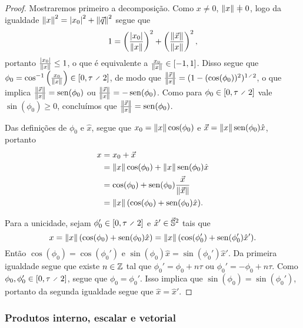 \begin{proof}
Mostraremos primeiro a decomposição. Como $x \neq 0$, $\nor{x} \neq 0$, logo da igualdade $\nor{x}^2 = \abs{\esc{x}}^2 + \nor{\vec{q}}^2$ segue que
	\begin{equation*}
	1 = \left( \frac{\abs{\esc{x}}}{\nor{x}} \right)^2 + \left( \frac{\nor{\vec{x}}}{\nor{x}} \right)^2,
	\end{equation*}
portanto $\frac{\abs{\esc{x}}}{\nor{x}} \leq 1$, o que é equivalente a $\frac{\esc{x}}{\nor{x}} \in \intff{-1}{1}$. Disso segue que $\phi_0 = \cos\inv\left( \frac{\esc{x}}{\nor{x}} \right) \in \intff{0}{\tau \div 2}$, de modo que $\frac{\nor{\vec{x}}}{\nor{x}} = (1-(\cos(\phi_0))^2)^{1 \div 2}$, o que implica $\frac{\nor{\vec{x}}}{\nor{x}}=\sin(\phi_0)$ ou $\frac{\nor{\vec{x}}}{\nor{x}}=-\sin(\phi_0)$. Como para $\phi_0 \in \intff{0}{\tau \div 2}$ vale $\sin(\phi_0) \geq 0$, concluímos que $\frac{\nor{\vec{x}}}{\nor{x}}=\sin(\phi_0)$.

Das definições de $\phi_0$ e $\hat{x}$, segue que $\esc{x} = \nor{x}\cos(\phi_0)$ e $\vec{x} = \nor{x}\sin(\phi_0)\hat{x}$, portanto
	\begin{align*}
	x &= \esc{x} + \vec{x} \\
		&= \nor{x}\cos(\phi_0) + \nor{x}\sin(\phi_0)\hat{x} \\
		&= \cos(\phi_0) + \sin(\phi_0) \frac{\vec{x}}{\nor{\vec{x}}} \\
		&= \nor{x} (\cos(\phi_0) + \sin(\phi_0) \hat{x}).
		\qedhere
	\end{align*}

Para a unicidade, sejam $\phi_0' \in \intff{0}{\tau \div 2}$ e $\hat{x}' \in \vec{\S}^2$ tais que
	\begin{equation*}
	x = \nor{x}(\cos(\phi_0) + \sin(\phi_0) \hat{x}) = \nor{x}(\cos(\phi_0') + \sin(\phi_0') \hat{x}').
	\end{equation*}
Então $\cos(\phi_0) = \cos(\phi_0')$ e $\sin(\phi_0) \hat{x} = \sin(\phi_0') \hat{x}'$. Da primeira igualdade segue que existe $n \in \Z$ tal que $\phi_0' = \phi_0 + n\tau$ ou $\phi_0' = -\phi_0 + n\tau$. Como $\phi_0,\phi_0' \in \intff{0}{\tau \div 2}$, segue que $\phi_0 = \phi_0'$. Isso implica que $\sin(\phi_0) = \sin(\phi_0')$, portanto da segunda igualdade segue que $\hat{x} = \hat{x}'$.
\end{proof}

\subsubsection{Produtos interno, escalar e vetorial}

